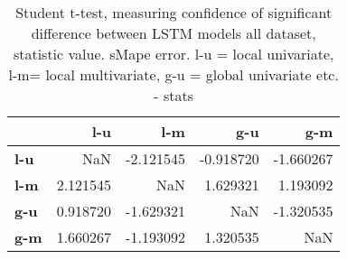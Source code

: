 \begin{table}[H]
\centering
\caption{Student t-test, measuring confidence of significant difference between LSTM models all dataset, statistic value. sMape error.  l-u = local univariate, l-m= local multivariate, g-u = global univariate etc. - stats}
\label{table:ttest-stats-lstm-experiments-sMAPE-all-dataset}
\begin{tabular}{lrrrr}
\toprule
{} &       l-u &       l-m &       g-u &       g-m \\
\midrule
\textbf{l-u} &       NaN & -2.121545 & -0.918720 & -1.660267 \\
\textbf{l-m} &  2.121545 &       NaN &  1.629321 &  1.193092 \\
\textbf{g-u} &  0.918720 & -1.629321 &       NaN & -1.320535 \\
\textbf{g-m} &  1.660267 & -1.193092 &  1.320535 &       NaN \\
\bottomrule
\end{tabular}
\end{table}

